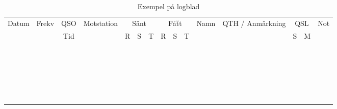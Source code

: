 \setlongtables
\begin{longtable}{|c|c|c|c|c|c|c|c|c|c|c|c|c|c|c|}
\caption{Exempel på logblad} \\ \hline
Datum & Frekv & QSO & Motstation & \multicolumn{3}{c}{Sänt} & \multicolumn{3}{c}{Fåẗt} & Namn & QTH / Anmärkning & \multicolumn{2}{c}{QSL} & Not \\
      &       & Tid &            & R & S & T                & R & S & T                &      &                  & S & M                   & \\ \hline \hline
 & & & & & & & & & & & & & & \\ \hline
 & & & & & & & & & & & & & & \\ \hline
 & & & & & & & & & & & & & & \\ \hline
 & & & & & & & & & & & & & & \\ \hline
 & & & & & & & & & & & & & & \\ \hline
 & & & & & & & & & & & & & & \\ \hline
 & & & & & & & & & & & & & & \\ \hline
 & & & & & & & & & & & & & & \\ \hline
 & & & & & & & & & & & & & & \\ \hline
 & & & & & & & & & & & & & & \\ \hline
 & & & & & & & & & & & & & & \\ \hline
 & & & & & & & & & & & & & & \\ \hline
 & & & & & & & & & & & & & & \\ \hline
 & & & & & & & & & & & & & & \\ \hline
 & & & & & & & & & & & & & & \\ \hline
 & & & & & & & & & & & & & & \\ \hline
 & & & & & & & & & & & & & & \\ \hline
 & & & & & & & & & & & & & & \\ \hline
 & & & & & & & & & & & & & & \\ \hline
 & & & & & & & & & & & & & & \\ \hline
 & & & & & & & & & & & & & & \\ \hline
 & & & & & & & & & & & & & & \\ \hline
 & & & & & & & & & & & & & & \\ \hline
\end{longtable}
